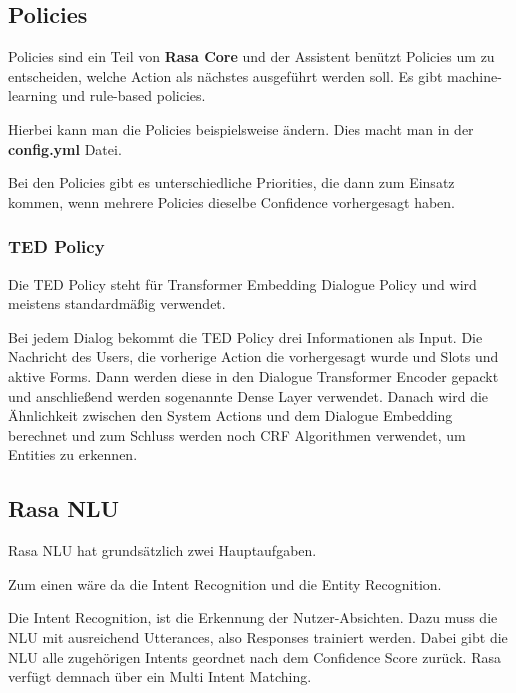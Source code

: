 \subsection{Policies}

Policies sind ein Teil von \textbf{Rasa Core} und der Assistent benützt Policies um zu entscheiden, welche Action als nächstes ausgeführt werden soll.
Es gibt machine-learning und rule-based policies.\cite{policies}

Hierbei kann man die Policies beispielsweise ändern.
Dies macht man in der \textbf{config.yml} Datei.

Bei den Policies gibt es unterschiedliche Priorities, die dann zum Einsatz kommen, wenn mehrere Policies dieselbe Confidence vorhergesagt haben.\cite{policyPriority}

\subsubsection{TED Policy}

Die TED Policy steht für Transformer Embedding Dialogue Policy und wird meistens standardmäßig verwendet.\cite{tedPolicy}

Bei jedem Dialog bekommt die TED Policy drei Informationen als Input.
Die Nachricht des Users, die vorherige Action die vorhergesagt wurde und Slots und aktive Forms.
Dann werden diese in den Dialogue Transformer Encoder gepackt und anschließend werden sogenannte Dense Layer verwendet.
Danach wird die Ähnlichkeit zwischen den System Actions und dem Dialogue Embedding berechnet und zum Schluss werden noch CRF Algorithmen verwendet, um Entities zu erkennen.\cite{tedPolicy}



\subsection{Rasa NLU}

Rasa NLU hat grundsätzlich zwei Hauptaufgaben.

Zum einen wäre da die Intent Recognition und die Entity Recognition.\cite{rasanlu, pretrainedVsSupervised}

Die Intent Recognition, ist die Erkennung der Nutzer-Absichten.
Dazu muss die NLU mit ausreichend Utterances, also Responses trainiert werden.
Dabei gibt die NLU alle zugehörigen Intents geordnet nach dem Confidence Score zurück.
Rasa verfügt demnach über ein Multi Intent Matching.\cite{rasanlu, pretrainedVsSupervised}

